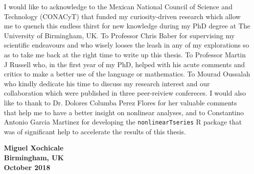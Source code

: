 
\begin{acknowledgements}      

I would like to acknowledge to the Mexican National Council of Science and 
Technology (CONACyT) that funded my curiosity-driven research which 
allow me to quench this endless thirst for new knowledge during my 
PhD degree at The University of Birmingham, UK.
To Professor Chris Baber for supervising my scientific endeavours
and who wisely looses the leash in any of my explorations 
so as to take me back at the right time to write up this thesis.
To Professor Martin J Russell who, in the first year 
of my PhD, helped with his acute comments and critics to make a
better use of the language or mathematics.
To Mourad Oussalah who kindly dedicate his time to discuss 
my research interest and our collaboration which were published 
in three peer-reiview confereces.
I would also like to thank to Dr. Dolores Columba Perez Flores for
her valuable comments that help me to have a better insight on
nonlinear analyses, and to Constantino Antonio Garcia Martinez 
for developing the \texttt{nonlinearTseries} R package that was of 
significant help to accelerate the results of this thesis.

\begin{flushright}
\textbf{Miguel Xochicale}\\
\textbf{Birmingham, UK}\\
\textbf{October 2018}
\end{flushright}

\end{acknowledgements}

